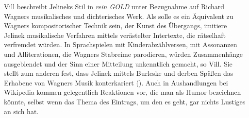 \documentclass[fontsize=12pt]{scrartcl}
\begin{document}
Vill beschreibt Jelineks Stil in \textit{rein GOLD} unter Bezugnahme auf Richard Wagners musikalisches und dichterisches Werk. Als solle es ein \"Aquivalent zu Wagners kompositorischer Technik sein, der Kunst des \"Ubergangs, imitiere Jelinek musikalische Verfahren mittels ver\"astelter Intertexte, die r\"atselhaft verfremdet w\"urden. In Sprachspielen mit Kinderabz\"ahlversen, mit Assonanzen und Alliterationen, die Wagners Stabreime parodieren, w\"urden Zusammenh\"ange ausgeblendet und der Sinn einer Mitteilung unkenntlich gemacht, so Vill. Sie stellt zum anderen fest, dass Jelinek mittels Burleske und derben Sp\"a{\ss}en das Erhabene von Wagners Musik konter\-ka\-riert (\cite{Vill2013}). Auch in Aushandlungen bei Wi\-ki\-pe\-dia kommen gelegentlich Reaktionen vor, die man als Humor be\-zeichnen k\"onnte, \mbox{selbst} wenn das Thema des Eintrags, um den es geht, gar nichts Lustiges an sich hat.
\end{document}
